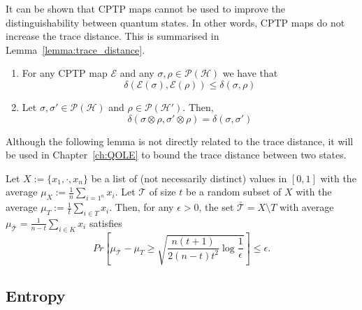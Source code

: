 It can be shown that CPTP maps cannot be used to improve the distinguishability between quantum states. In other words, CPTP maps do not increase the trace distance. This is summarised in Lemma~\ref{lemma:trace_distance}.


\begin{lemma}

\begin{enumerate}

    The trace distance has the following properties:

    \item For any CPTP map $\mathcal{E}$ and any $\sigma, \rho \in \mathcal{P}(\mathcal{H})$ we have that
    $$\delta(\mathcal{E}(\sigma), \mathcal{E}(\rho)) \leq \delta(\sigma, \rho)$$
    
    \item Let $\sigma, \sigma' \in \mathcal{P}(\mathcal{H})$ and $\rho \in \mathcal{P}(\mathcal{H}')$. Then,
    $$\delta(\sigma\otimes \rho, \sigma'\otimes \rho) = \delta(\sigma, \sigma')$$
\end{enumerate}

\label{lemma:trace_distance}
\end{lemma}

Although the following lemma is not directly related to the trace distance, it will be used in Chapter~\ref{ch:QOLE} to bound the trace distance between two states.

\begin{lemma}
Let $X:=\{x_1, \cdot, x_n\}$ be a list of (not necessarily distinct) values in $[0,1]$ with the average $\mu_X:=\frac{1}{n}\sum_{i=1^n} x_i$. Let $\mathcal{T}$ of size $t$ be a random subset of $X$ with the average $\mu_T := \frac{1}{t}\sum_{i\in T} x_i$. Then, for any $\epsilon > 0$, the set $\bar{\mathcal{T}} = X\setminus T$ with average $\mu_{\bar{\mathcal{T}}} = \frac{1}{n-t}\sum_{i\in K} x_i$ satisfies
$$Pr\left[ \mu_{\bar{\mathcal{T}}} - \mu_T \geq \sqrt{\frac{n(t+1)}{2(n-t)t^2} \log \frac{1}{\epsilon}}  \right] \leq \epsilon.$$
\label{lemma:trace_distance_bound}
\end{lemma}


\subsection{Entropy}

